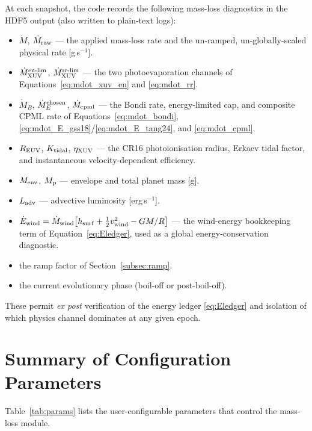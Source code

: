 \documentclass{aastex701}
\newcommand{\Mdot}{\dot{M}}
\newcommand{\Menv}{M_{\rm env}}
\newcommand{\Mp}{M_{\rm p}}
\newcommand{\Ladv}{L_{\rm adv}}
\begin{document}
At each snapshot, the code records the following mass-loss
diagnostics in the HDF5 output (also written to plain-text logs):
\begin{itemize}
  \item $\Mdot$, $\Mdot_{\rm raw}$ --- the applied mass-loss rate
        and the un-ramped, un-globally-scaled physical rate
        [g\,s$^{-1}$].
  \item $\Mdot_{\rm XUV}^{\rm en\text{-}lim}$,
        $\Mdot_{\rm XUV}^{\rm rr\text{-}lim}$ --- the two
        photoevaporation channels of
        Equations~\eqref{eq:mdot_xuv_en} and \eqref{eq:mdot_rr}.
  \item $\Mdot_{B}$, $\Mdot_{E}^{\rm chosen}$,
        $\Mdot_{\rm cpml}$ --- the Bondi rate, energy-limited cap, and
        composite CPML rate of Equations~\eqref{eq:mdot_bondi},
        \eqref{eq:mdot_E_gss18}/\eqref{eq:mdot_E_tang24}, and
        \eqref{eq:mdot_cpml}.
  \item $R_{\rm EUV}$, $K_{\rm tidal}$, $\eta_{\rm XUV}$ --- the CR16
        photoionisation radius, Erkaev tidal factor, and instantaneous
        velocity-dependent efficiency.
  \item $\Menv$, $\Mp$ --- envelope and total planet mass [g].
  \item $\Ladv$ --- advective luminosity [erg\,s$^{-1}$].
  \item $\dot E_{\rm wind} = \Mdot_{\rm wind}
        \bigl[h_{\rm surf} + \tfrac{1}{2}v_{\rm wind}^{2} - GM/R\bigr]$
        --- the wind-energy bookkeeping term of
        Equation~\eqref{eq:Eledger}, used as a global
        energy-conservation diagnostic.
  \item the ramp factor of Section~\ref{subsec:ramp}.
  \item the current evolutionary phase (boil-off or post-boil-off).
\end{itemize}
These permit \emph{ex post} verification of the energy ledger
\eqref{eq:Eledger} and isolation of which physics channel dominates
at any given epoch.

\section{Summary of Configuration Parameters}\label{sec:params}

Table~\ref{tab:params} lists the user-configurable parameters that
control the mass-loss module.
\end{document}
